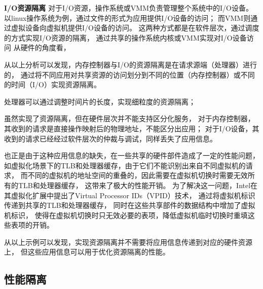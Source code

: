 \textbf{I/O资源隔离}\quad	%
对于I/O资源，操作系统或VMM负责管理整个系统中的I/O设备。
以linux操作系统为例，通过文件的形式为应用提供I/O设备的访问；
而VMM则通过虚拟设备向虚拟机提供I/O设备的访问。
这两种方式都是在软件层次，通过调度的方式实现I/O资源的隔离，
通过共享的操作系统内核或VMM实现对I/O设备访问
从硬件的角度看，

从以上分析可以发现，内存控制器与I/O的资源隔离是在请求源端（处理器）进行的，
通过将不同应用对共享资源的访问划分到不同的位置（内存控制器）或不同的时间（I/O）实现资源隔离。

处理器可以通过调整时间片的长度，实现细粒度的资源隔离；



虽然实现了资源隔离，但在硬件层次并不能支持区分化服务，
对于内存控制器，其收到的请求是直接操作映射后的物理地址，不能区分出应用；
对于I/O设备，其收到的请求已经经过软件层次的仲裁与调试，同样丢失了应用信息。

也正是由于这种应用信息的缺失，在一些共享的硬件部件造成了一定的性能问题，
如虚拟化场景下的TLB和处理器缓存，由于它们不能识别出来自不同虚拟机的请求，
而不同的虚拟机的地址空间的重叠的，因此需要在虚拟机切换时需要无效所有的TLB和处理器缓存，
这带来了极大的性能开销。
为了解决这一问题，Intel在其虚拟化扩展中提出了Virtual Processor IDs（VPID）技术，
通过将虚拟机标识传递到共享的TLB和处理器缓存，
同时在这些共享部件的数据结构中增加了虚拟机标识，
使得在虚拟机切换时只无效必要的表项，降低虚拟机临时切换时重填这些表项的开销。

从以上示例可以发现，实现资源隔离并不需要将应用信息传递到对应的硬件资源上，
但这些应用信息可以用于优化资源隔离的性能。


\subsection{性能隔离}

\fi
